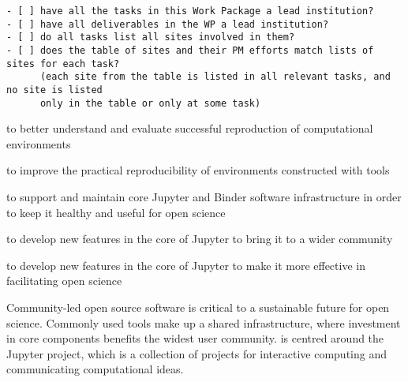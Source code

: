 \begin{draft}
\begin{verbatim}
- [ ] have all the tasks in this Work Package a lead institution?
- [ ] have all deliverables in the WP a lead institution?
- [ ] do all tasks list all sites involved in them?
- [ ] does the table of sites and their PM efforts match lists of sites for each task?
      (each site from the table is listed in all relevant tasks, and no site is listed
      only in the table or only at some task)
\end{verbatim}
\end{draft}

\begin{workpackage}[
  id=reproducibility,
  wphases=0-36,
  title=Improving robustness of reproducibility,
  short=Core,
  swsites,
  lead=SRL,
  SRLRM=30,
]
\begin{wpobjectives}
  \begin{compactitem}
    \item to better understand and evaluate successful reproduction of computational environments
    \item to improve the practical reproducibility of environments constructed with \TheProject tools
    \item to support and maintain core Jupyter and Binder software infrastructure in order to keep it healthy
         and useful for open science
    \item to develop new features in the core of Jupyter to bring it to a wider community
    \item to develop new features in the core of Jupyter to make it more effective
         in facilitating open science

 \end{compactitem}
\end{wpobjectives}

\begin{wpdescription}


Community-led open source software is critical to a sustainable future for open science.
Commonly used tools make up a shared infrastructure,
where investment in core components benefits the widest user community.
\TheProject is centred around the Jupyter project,
which is a collection of projects for interactive computing and
communicating computational ideas.


\end{wpdescription}
\end{workpackage}
